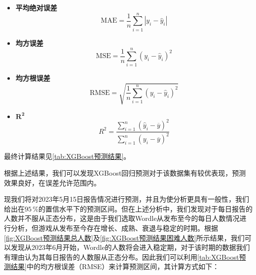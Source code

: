 \documentclass{MathModeling}
\begin{document}
	\begin{itemize}
		\item \textbf{平均绝对误差}
			\begin{equation}
			\mathrm{MAE}=\frac{1}{n}\sum_{i=1}^{n}\left|y_{i}-\hat{y}_{i}\right| \label{MAE}
			\end{equation}
		\item \textbf{均方误差}
			\begin{equation}
			\mathrm{MSE}=\frac{1}{n}\sum_{i=1}^{n}\left(y_{i}-\hat{y}_{i}\right)^{2} \label{MSE}
			\end{equation}
		\item \textbf{均方根误差}
			\begin{equation}
			\mathrm{RMSE}=\sqrt{\frac{1}{n}\sum_{i=1}^{n}\left(y_{i}-\hat{y}_{i}\right)^{2}} \label{RMSE}
			\end{equation}
		\item $\boldsymbol{R^2}$
			\begin{equation}
			R^{2}=\frac{\sum\limits_{i=1}^{n}\left(\hat{y}_{i}-\overline{y}\right)^{2}}{\sum\limits_{i=1}^{n}\left(y_{i}-\overline{y}\right)^{2}} \label{R2}
			\end{equation}
	\end{itemize}

	最终计算结果见\textcolor{blue}{\cref{tab:XGBoost预测结果}}。
\begin{table}[H]
	\centering
	\caption{XGBoost回归预测结果}
	\label{tab:XGBoost预测结果}
\end{table}
  
根据上述结果，我们可以发现XGBoost回归预测对于该数据集有较优表现，预测效果良好，在误差允许范围内。

现我们将对2023年5月15日报告情况进行预测，并且为使分析更具有一般性，我们给出在$95\,\%$的置信水平下的预测区间。但在上述分析中，我们发现对于每日报告的人数并不服从正态分布，这是由于我们选取Wordle从发布至今的每日人数情况进行分析，但游戏从发布至今存在增长、成熟、衰退与稳定的时期。根据\textcolor{blue}{\cref{fig:XGBoost预测结果总人数}}及\textcolor{blue}{\cref{fig:XGBoost预测结果困难人数}}所示结果，我们可以发现从2023年6月开始，Wordle的人数将会进入稳定期，对于该时期的数据我们有理由认为其每日报告的人数服从正态分布。因此我们可以利用\textcolor{blue}{\cref{tab:XGBoost预测结果}}中的均方根误差（RMSE）来计算预测区间，其计算方式如下：
\end{document}
